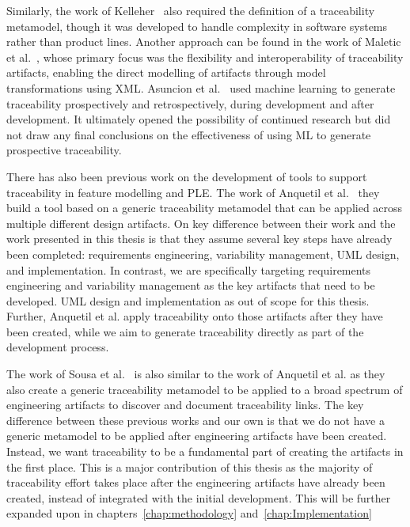 
Similarly, the work of Kelleher~\cite{kelleher2005reusable} also required the definition of a traceability metamodel, though it was developed to handle complexity in software systems rather than product lines. Another approach can be found in the work of Maletic et al.~\cite{maletic2005xml}, whose primary focus was the flexibility and interoperability of traceability artifacts, enabling the direct modelling of artifacts through model transformations using XML. Asuncion et al.~\cite{asuncion2010software} used machine learning to generate traceability prospectively and retrospectively, during development and after development. It ultimately opened the possibility of continued research but did not draw any final conclusions on the effectiveness of using ML to generate prospective traceability.

There has also been previous work on the development of tools to support traceability in feature modelling and \gls{PLE}. The work of Anquetil et al.~\cite{anquetil2008model} they build a tool based on a generic traceability metamodel that can be applied across multiple different design artifacts. On key difference between their work and the work presented in this thesis is that they assume several key steps have already been completed: requirements engineering, variability management, UML design, and implementation. In contrast, we are specifically targeting requirements engineering and variability management as the key artifacts that need to be developed. UML design and implementation as out of scope for this thesis. Further, Anquetil et al. apply traceability onto those artifacts after they have been created, while we aim to generate traceability directly as part of the development process. 

The work of Sousa et al.~\cite{sousa2008model} is also similar to the work of Anquetil et al. as they also create a generic traceability metamodel to be applied to a broad spectrum of engineering artifacts to discover and document traceability links. The key difference between these previous works and our own is that we do not have a generic metamodel to be applied after engineering artifacts have been created. Instead, we want traceability to be a fundamental part of creating the artifacts in the first place. This is a major contribution of this thesis as the majority of traceability effort takes place after the engineering artifacts have already been created, instead of integrated with the initial development. This will be further expanded upon in chapters~\ref{chap:methodology} and~\ref{chap:Implementation}


